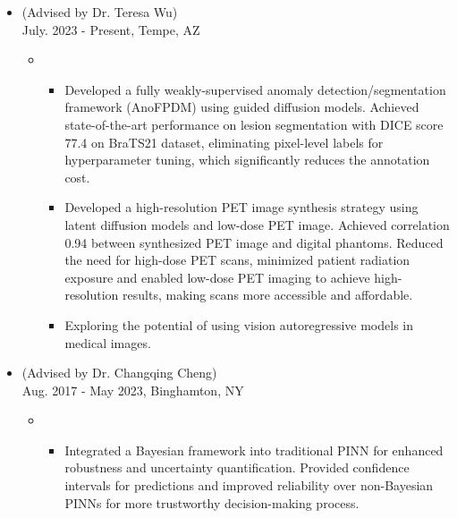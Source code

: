 \documentclass[10pt]{article}
\begin{document}
\begin{itemize}
	\item {} (Advised by Dr. Teresa Wu)\\
        \hfill{July. 2023 - Present, Tempe, AZ}
		\vspace{-0.5em}
        \begin{itemize}[label=$\bullet$]
			\setlength\itemsep{0.5pt}
            \item {}
            \vspace{-0.5em}
            \begin{itemize}[label=$-$]
				\item Developed a fully weakly-supervised anomaly detection/segmentation framework (AnoFPDM) using guided diffusion models. Achieved state-of-the-art performance on lesion segmentation with DICE score 77.4 on BraTS21 dataset, eliminating pixel-level labels for hyperparameter tuning, which significantly reduces the annotation cost.
				\item Developed a high-resolution PET image synthesis strategy using latent diffusion models and low-dose PET image. Achieved correlation 0.94 between synthesized PET image and digital phantoms. Reduced the need for high-dose PET scans, minimized patient radiation exposure and enabled low-dose PET imaging to achieve high-resolution results, making scans more accessible and affordable.
				\item Exploring the potential of using vision autoregressive models in medical images.
			\end{itemize}
        \end{itemize}
        
	\item {} (Advised by Dr. Changqing Cheng)\\
		\hfill{Aug. 2017 - May 2023, Binghamton, NY}
		\vspace{-0.5em}

		\begin{itemize}[label=$\bullet$]
			\setlength\itemsep{0.5pt}
			\item {}
			\vspace{-0.5em}
			\begin{itemize}[label=$-$]
				\setlength\itemsep{0.5pt}
				\item Integrated a Bayesian framework into traditional PINN for enhanced robustness and uncertainty quantification. Provided confidence intervals for predictions and improved reliability over non-Bayesian PINNs for more trustworthy decision-making process. 
			\end{itemize}
			

\end{itemize}
\end{itemize}
\end{document}
